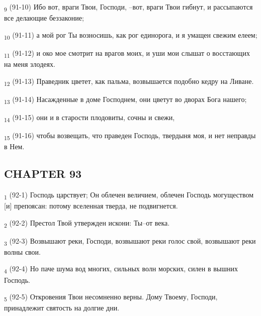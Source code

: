 \begin{tcolorbox}
\textsubscript{9} (91-10) Ибо вот, враги Твои, Господи, --вот, враги Твои гибнут, и рассыпаются все делающие беззаконие;
\end{tcolorbox}
\begin{tcolorbox}
\textsubscript{10} (91-11) а мой рог Ты возносишь, как рог единорога, и я умащен свежим елеем;
\end{tcolorbox}
\begin{tcolorbox}
\textsubscript{11} (91-12) и око мое смотрит на врагов моих, и уши мои слышат о восстающих на меня злодеях.
\end{tcolorbox}
\begin{tcolorbox}
\textsubscript{12} (91-13) Праведник цветет, как пальма, возвышается подобно кедру на Ливане.
\end{tcolorbox}
\begin{tcolorbox}
\textsubscript{13} (91-14) Насажденные в доме Господнем, они цветут во дворах Бога нашего;
\end{tcolorbox}
\begin{tcolorbox}
\textsubscript{14} (91-15) они и в старости плодовиты, сочны и свежи,
\end{tcolorbox}
\begin{tcolorbox}
\textsubscript{15} (91-16) чтобы возвещать, что праведен Господь, твердыня моя, и нет неправды в Нем.
\end{tcolorbox}
\subsection{CHAPTER 93}
\begin{tcolorbox}
\textsubscript{1} (92-1) Господь царствует; Он облечен величием, облечен Господь могуществом [и] препоясан: потому вселенная тверда, не подвигнется.
\end{tcolorbox}
\begin{tcolorbox}
\textsubscript{2} (92-2) Престол Твой утвержден искони: Ты--от века.
\end{tcolorbox}
\begin{tcolorbox}
\textsubscript{3} (92-3) Возвышают реки, Господи, возвышают реки голос свой, возвышают реки волны свои.
\end{tcolorbox}
\begin{tcolorbox}
\textsubscript{4} (92-4) Но паче шума вод многих, сильных волн морских, силен в вышних Господь.
\end{tcolorbox}
\begin{tcolorbox}
\textsubscript{5} (92-5) Откровения Твои несомненно верны. Дому Твоему, Господи, принадлежит святость на долгие дни.
\end{tcolorbox}

